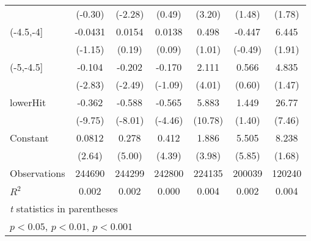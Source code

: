 {\begin{tabular}{l*{6}{c}}
                    &     (-0.30)         &     (-2.28)         &      (0.49)         &      (3.20)         &      (1.48)         &      (1.78)         \\
[1em]
(-4.5,-4]           &     -0.0431         &      0.0154         &      0.0138         &       0.498         &      -0.447         &       6.445         \\
                    &     (-1.15)         &      (0.19)         &      (0.09)         &      (1.01)         &     (-0.49)         &      (1.91)         \\
[1em]
(-5,-4.5]           &      -0.104\sym{**} &      -0.202\sym{*}  &      -0.170         &       2.111\sym{***}&       0.566         &       4.835         \\
                    &     (-2.83)         &     (-2.49)         &     (-1.09)         &      (4.01)         &      (0.60)         &      (1.47)         \\
[1em]
lowerHit            &      -0.362\sym{***}&      -0.588\sym{***}&      -0.565\sym{***}&       5.883\sym{***}&       1.449         &       26.77\sym{***}\\
                    &     (-9.75)         &     (-8.01)         &     (-4.46)         &     (10.78)         &      (1.40)         &      (7.46)         \\
[1em]
Constant            &      0.0812\sym{**} &       0.278\sym{***}&       0.412\sym{***}&       1.886\sym{***}&       5.505\sym{***}&       8.238         \\
                    &      (2.64)         &      (5.00)         &      (4.39)         &      (3.98)         &      (5.85)         &      (1.68)         \\
\hline
Observations        &      244690         &      244299         &      242800         &      224135         &      200039         &      120240         \\
\(R^{2}\)           &       0.002         &       0.002         &       0.000         &       0.004         &       0.002         &       0.004         \\
\hline\hline
\multicolumn{7}{l}{\footnotesize \textit{t} statistics in parentheses}\\
\multicolumn{7}{l}{\footnotesize \sym{*} \(p<0.05\), \sym{**} \(p<0.01\), \sym{***} \(p<0.001\)}\\
\end{tabular}
}
